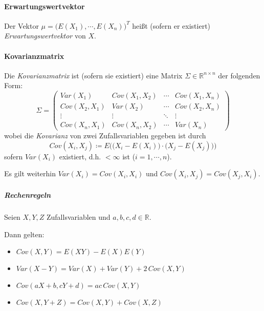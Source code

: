 \documentclass[a4paper, 11pt, accentcolor = tud3b]{tudreport}
\newcommand{\R}{\ensuremath{\mathbb{R}}}
\newcommand{\Var}{\ensuremath{\textit{Var}}}
\newcommand{\Cov}{\ensuremath{\textit{Cov}}}
\begin{document}
            \paragraph{Erwartungswertvektor}
	            Der Vektor \( \mu = \big( E(X_1), \cdots, E(X_n) \big)^T \) heißt (sofern er existiert) \textit{Erwartungswertvektor} von \(X\).
            
            \paragraph{Kovarianzmatrix}
	            Die \textit{Kovarianzmatrix} ist (sofern sie existiert) eine Matrix \( \Sigma \in \R^{n \times n} \) der folgenden Form:
	            \begin{equation*}
		            \Sigma =
		            \begin{pmatrix}
		            	\Var(X_1)      & \Cov(X_1, X_2) & \cdots & \Cov(X_1, X_n) \\
		            	\Cov(X_2, X_1) & \Var(X_2)      & \cdots & \Cov(X_2, X_n) \\
		            	\vdots         & \vdots         & \ddots & \vdots         \\
		            	\Cov(X_n, X_1) & \Cov(X_n, X_2) & \cdots & \Var(X_n)
		            \end{pmatrix}
	            \end{equation*}
	            wobei die \textit{Kovarianz} von zwei Zufallsvariablen gegeben ist durch \[ \Cov(X_i, X_j) \coloneqq E\Big( \big(X_i - E(X_i)\big) \cdot \big(X_j - E(X_j)\big) \Big) \] sofern \( \Var(X_i) \) existiert, d.h. \( < \infty \) ist (\( i = 1, \cdots, n \)).
	            
	            Es gilt weiterhin \( \Var(X_i) = \Cov(X_i, X_i) \) und \( \Cov(X_i, X_j) = \Cov(X_j, X_i) \).
	            
	            \subparagraph{Rechenregeln}
		            Seien \(X, Y, Z\) Zufallsvariablen und \( a, b, c, d \in \R \).
		            
		            Dann gelten:
		            \begin{itemize}
		            	\item \( \Cov(X, Y) = E(XY) - E(X) E(Y) \)
		            	\item \( \Var(X - Y) = \Var(X) + \Var(Y) + 2 \, \Cov(X, Y) \)
		            	\item \( \Cov(aX + b, cY + d) = ac \, \Cov(X, Y) \)
		            	\item \( \Cov(X, Y + Z) = \Cov(X, Y) + \Cov(X, Z) \)
		            \end{itemize}
	            
\end{document}
